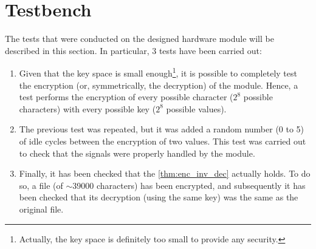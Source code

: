 \section{Testbench}
\label{sec:tests}
The tests that were conducted on the designed hardware module will be described in this section. In particular, 3 tests have been carried out:

\begin{enumerate}
    \item Given that the key space is small enough\footnote{Actually, the key space is definitely too small to provide any security.}, it is possible to completely test the encryption (or, symmetrically, the decryption) of the module. Hence, a test performs the encryption of every possible character ($2^8$ possible characters) with every possible key ($2^8$ possible values).
    \item The previous test was repeated, but it was added a random number (0 to 5) of idle cycles between the encryption of two values. This test was carried out to check that the signals were properly handled by the module.
    \item Finally, it has been checked that the \cref{thm:enc_inv_dec} actually holds. To do so, a file (of $\sim$39000 characters) has been encrypted, and subsequently it has been checked that its decryption (using the same key) was the same as the original file.
\end{enumerate}